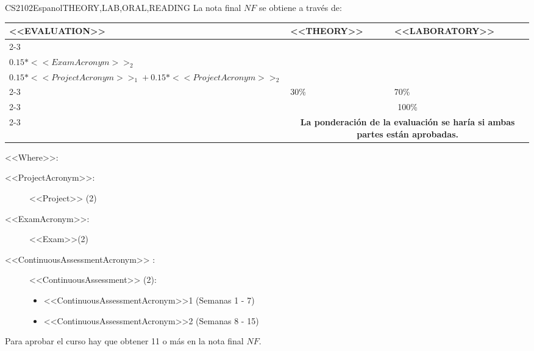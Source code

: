   \begin{evaluation}{CS2102}{Espanol}{THEORY,LAB,ORAL,READING}
  La nota final $NF$ se obtiene a través de:
 
  \begin{tabularx}{0.9\textwidth}{|X|p{}|p{}|} \hline
  \multirow{4}{*}{\uppercase{<<Evaluation>>}} & \uppercase{<<Theory>>} & \uppercase{<<Laboratory>>} \\ \cline{2-3}
  & %
      \begin{minipage}{0.95\textwidth}
      \begin{tabular}{l}
          $0.15*<<ExamAcronym>>_{1}$ + \\  
          $0.15*<<ExamAcronym>>_{2}$
      \end{tabular} 
      \end{minipage} 
  & %
      \begin{minipage}{0.95\textwidth}
      \begin{tabular}{l}
          $0.20*<<ContinuousAssessmentAcronym>>_{1} + 0.20*<<ContinuousAssessmentAcronym>>_{2}$  +\\
          $0.15*<<ProjectAcronym>>_{1} + 0.15*<<ProjectAcronym>>_{2}$
          \end{tabular} 
      \end{minipage}                 \\ \cline{2-3}
  
  & %
  30\% 
  & %
  70\% \\ \cline{2-3}
  & \multicolumn{2}{c|}{100\%}  \\ \cline{2-3}
  & \multicolumn{2}{c|}{\textbf{La ponderación de la evaluación se haría si ambas partes están aprobadas.}}  \\ \hline
  \end{tabularx}
  
  \vspace{2mm}
  \noindent <<Where>>:
  \begin{description}
    \item[<<ProjectAcronym>>:] <<Project>> (2)   
    \item[<<ExamAcronym>>:] <<Exam>>(2) 
    \item[<<ContinuousAssessmentAcronym>> :] <<ContinuousAssessment>> (2):
        \begin{itemize}
              \item  <<ContinuousAssessmentAcronym>>1 (Semanas 1 - 7)
              \item <<ContinuousAssessmentAcronym>>2 (Semanas 8 - 15)
        \end{itemize}
  \end{description}
  
  \noindent Para aprobar el curso hay que obtener 11 o más en la nota final $NF$.
  \end{evaluation}
 
